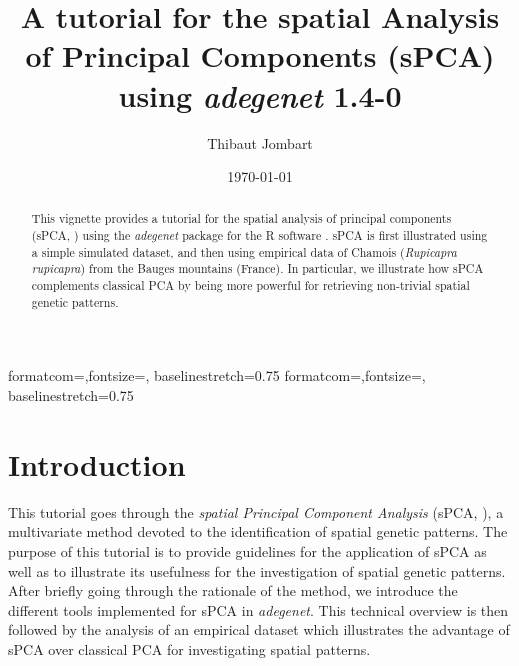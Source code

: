 \documentclass{article}
\title{A tutorial for the spatial Analysis of Principal Components (sPCA) using \textit{adegenet} 1.4-0}
\author{Thibaut Jombart}
\date{\today}
\begin{document}
{formatcom={\color{Sinput}},fontsize=\footnotesize, baselinestretch=0.75}
{formatcom={\color{Soutput}},fontsize=\footnotesize, baselinestretch=0.75}

\color{black}

\maketitle

\begin{abstract}
  This vignette provides a tutorial for the spatial analysis of principal components (sPCA, \cite{tjart04}) using
  the \textit{adegenet} package \cite{tjart05} for the R software \cite{np145}. sPCA is first
  illustrated using a simple simulated dataset, and then using empirical data of Chamois
  (\textit{Rupicapra rupicapra}) from the Bauges mountains (France). In particular, we illustrate
  how sPCA complements classical PCA by being more powerful for retrieving non-trivial spatial genetic patterns.
\end{abstract}


\newpage
\tableofcontents




\newpage
\section{Introduction}

This tutorial goes through the \emph{spatial Principal Component
  Analysis} (sPCA, \cite{tjart04}), a multivariate method devoted to
the identification of spatial genetic patterns.
The purpose of this tutorial is to provide guidelines for the application of sPCA as well as to
illustrate its usefulness for the investigation of spatial genetic patterns.
After briefly going through the rationale of the method, we introduce the different tools
implemented for sPCA in \textit{adegenet}.
This technical overview is then followed by the analysis of an empirical dataset which illustrates
the advantage of sPCA over classical PCA for investigating spatial patterns.




\end{document}
